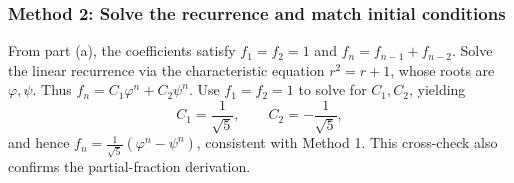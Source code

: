 \documentclass[12pt]{article}
\begin{document}
\subsubsection*{Method 2: Solve the recurrence and match initial conditions}
From part (a), the coefficients satisfy \(f_1=f_2=1\) and \(f_n=f_{n-1}+f_{n-2}\).
Solve the linear recurrence via the characteristic equation \(r^2=r+1\), whose roots are \(\varphi,\psi\).
Thus \(f_n=C_1\varphi^n+C_2\psi^n\). Use \(f_1=f_2=1\) to solve for \(C_1,C_2\), yielding
\[
C_1=\frac{1}{\sqrt{5}},\qquad C_2=-\frac{1}{\sqrt{5}},
\]
and hence \(f_n=\frac{1}{\sqrt{5}}(\varphi^n-\psi^n)\), consistent with Method 1.
This cross-check also confirms the partial-fraction derivation.
\end{document}
